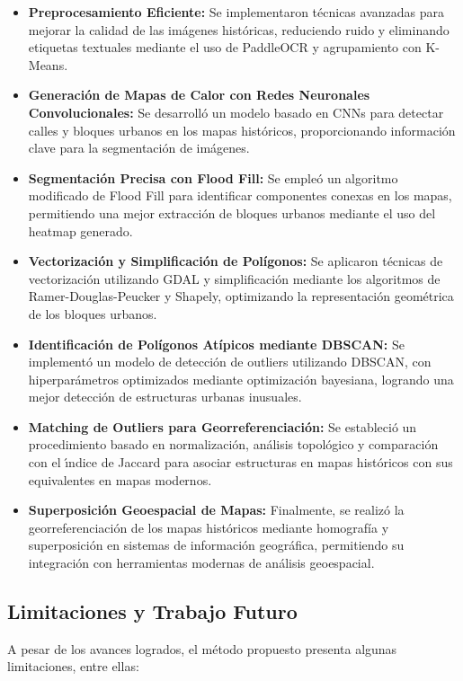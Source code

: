 \documentclass[twocolumn, fontsize=10pt]{article}
\begin{document}
\begin{itemize}
    \item \textbf{Preprocesamiento Eficiente:} Se implementaron t\'ecnicas avanzadas para mejorar la calidad de las im\'agenes hist\'oricas, reduciendo ruido y eliminando etiquetas textuales mediante el uso de PaddleOCR y agrupamiento con K-Means.
    \item \textbf{Generaci\'on de Mapas de Calor con Redes Neuronales Convolucionales:} Se desarroll\'o un modelo basado en CNNs para detectar calles y bloques urbanos en los mapas hist\'oricos, proporcionando informaci\'on clave para la segmentaci\'on de im\'agenes.
    \item \textbf{Segmentaci\'on Precisa con Flood Fill:} Se emple\'o un algoritmo modificado de Flood Fill para identificar componentes conexas en los mapas, permitiendo una mejor extracci\'on de bloques urbanos mediante el uso del heatmap generado.
    \item \textbf{Vectorizaci\'on y Simplificaci\'on de Pol\'igonos:} Se aplicaron t\'ecnicas de vectorizaci\'on utilizando GDAL y simplificaci\'on mediante los algoritmos de Ramer-Douglas-Peucker y Shapely, optimizando la representaci\'on geom\'etrica de los bloques urbanos.
    \item \textbf{Identificaci\'on de Pol\'igonos At\'ipicos mediante DBSCAN:} Se implement\'o un modelo de detecci\'on de outliers utilizando DBSCAN, con hiperpar\'ametros optimizados mediante optimizaci\'on bayesiana, logrando una mejor detecci\'on de estructuras urbanas inusuales.
    \item \textbf{Matching de Outliers para Georreferenciaci\'on:} Se estableci\'o un procedimiento basado en normalizaci\'on, an\'alisis topol\'ogico y comparaci\'on con el \'{\i}ndice de Jaccard para asociar estructuras en mapas hist\'oricos con sus equivalentes en mapas modernos.
    \item \textbf{Superposici\'on Geoespacial de Mapas:} Finalmente, se realiz\'o la georreferenciaci\'on de los mapas hist\'oricos mediante homograf\'ia y superposici\'on en sistemas de informaci\'on geogr\'afica, permitiendo su integraci\'on con herramientas modernas de an\'alisis geoespacial.
\end{itemize}

\subsection{Limitaciones y Trabajo Futuro}

A pesar de los avances logrados, el m\'etodo propuesto presenta algunas limitaciones, entre ellas:
\end{document}
